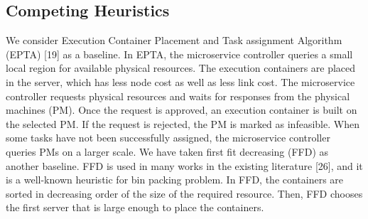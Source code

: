 \subsection{Competing Heuristics}
We consider Execution Container Placement and Task assignment Algorithm (EPTA) [19] as a baseline. In EPTA,
the microservice controller queries a small local region for
available physical resources. The execution containers are
placed in the server, which has less node cost as well as
less link cost. The microservice controller requests physical
resources and waits for responses from the physical machines
(PM). Once the request is approved, an execution container
is built on the selected PM. If the request is rejected, the
PM is marked as infeasible. When some tasks have not been
successfully assigned, the microservice controller queries PMs
on a larger scale. We have taken first fit decreasing (FFD) as
another baseline. FFD is used in many works in the existing
literature [26], and it is a well-known heuristic for bin packing
problem. In FFD, the containers are sorted in decreasing order
of the size of the required resource. Then, FFD chooses the
first server that is large enough to place the containers.
